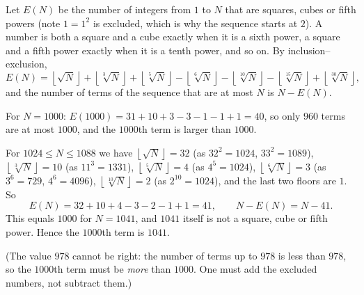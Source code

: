 Let $E(N)$ be the number of integers from $1$ to $N$ that are squares, cubes or fifth powers (note $1=1^2$ is excluded, which is why the sequence starts at $2$). A number is both a square and a cube exactly when it is a sixth power, a square and a fifth power exactly when it is a tenth power, and so on. By inclusion--exclusion,
\[
E(N)=\left\lfloor\sqrt N\right\rfloor+\left\lfloor\sqrt[3]N\right\rfloor+\left\lfloor\sqrt[5]N\right\rfloor-\left\lfloor\sqrt[6]N\right\rfloor-\left\lfloor\sqrt[10]N\right\rfloor-\left\lfloor\sqrt[15]N\right\rfloor+\left\lfloor\sqrt[30]N\right\rfloor ,
\]
and the number of terms of the sequence that are at most $N$ is $N-E(N)$.

For $N=1000$: $E(1000)=31+10+3-3-1-1+1=40$, so only $960$ terms are at most $1000$, and the $1000$th term is larger than $1000$.

For $1024\le N\le1088$ we have $\left\lfloor\sqrt N\right\rfloor=32$ (as $32^2=1024$, $33^2=1089$), $\left\lfloor\sqrt[3]N\right\rfloor=10$ (as $11^3=1331$), $\left\lfloor\sqrt[5]N\right\rfloor=4$ (as $4^5=1024$), $\left\lfloor\sqrt[6]N\right\rfloor=3$ (as $3^6=729$, $4^6=4096$), $\left\lfloor\sqrt[10]N\right\rfloor=2$ (as $2^{10}=1024$), and the last two floors are $1$. So
\[
E(N)=32+10+4-3-2-1+1=41,\qquad N-E(N)=N-41 .
\]
This equals $1000$ for $N=1041$, and $1041$ itself is not a square, cube or fifth power. Hence the $1000$th term is $\boxed{1041}$.

(The value $978$ cannot be right: the number of terms up to $978$ is less than $978$, so the $1000$th term must be \emph{more} than $1000$. One must add the excluded numbers, not subtract them.)
